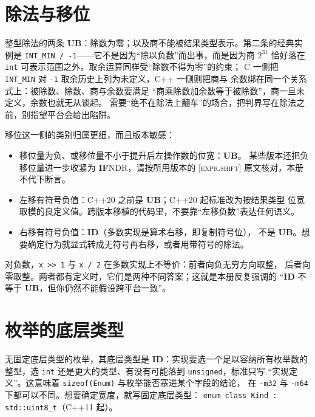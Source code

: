 \documentclass[12pt,a4paper,fontset=fandol]{ctexbook}
\newcommand{\cpp}[1]{C++#1}
\newcommand{\Tp}[1]{\texttt{#1}}
\newcommand{\Bk}{\discretionary{}{}{}}
\newcommand{\Lang}[1]{\textsf{#1}}
\newcommand{\CL}{\Lang{C}}
\newcommand{\CPP}{\Lang{C++}}
\newcommand{\UB}{\textbf{\textsf{UB}}}
\newcommand{\IDB}{\textbf{\textsf{ID}}}
\newcommand{\ILLF}{\textbf{\textsf{IF}}}
\newcommand{\Std}[1]{\textsc{[#1]}}
\begin{document}
\section{除法与移位}\label{sec:ub09-div-shift}

整型除法的两条 \UB{}：除数为零；以及商不能被结果类型表示。第二条的经典实例是
\Tp{INT\_MIN / -1}——它不是因为“除以负数”而出事，而是因为商
$2^{31}$ 恰好落在 \Tp{int} 可表示范围之外。取余运算同样受“除数不得为零”的约束；
\CL{} 一侧把 \Tp{INT\_MIN} 对 \Tp{-1} 取余历史上列为未定义，\CPP{} 一侧则把商与
余数绑在同一个关系式上：被除数、除数、商与余数要满足
“商乘除数加余数等于被除数”，商一旦未定义，余数也就无从谈起。
需要“绝不在除法上翻车”的场合，把判界写在除法之前，别指望平台会给出陷阱。

移位这一侧的类别归属更细，而且版本敏感：

\begin{itemize}
  \item 移位量为负、或移位量不小于提升后左操作数的位宽：\UB{}。
        某些版本还把负移位量进一步收紧为 \ILLF{NDR}，请按所用版本的
        \Std{expr.shift} 原文核对，本册不代下断言。
  \item 左移有符号负值：\cpp{20} 之前是 \UB{}；\cpp{20} 起标准改为按结果类型
        位宽取模的良定义值。跨版本移植的代码里，不要靠“左移负数”表达任何语义。
  \item 右移有符号负值：\IDB{}（多数实现是算术右移，即复制符号位），
        不是 \UB{}。想要确定行为就显式转成无符号再右移，或者用带符号的除法。
\end{itemize}

\begin{warning}[title={别把“除二向下取整”写成“右移一位”}]
对负数，\Tp{x >> 1} 与 \Tp{x / 2} 在多数实现上不等价：前者向负无穷方向取整，
后者向零取整。两者都有定义时，它们是两种不同答案；这就是本册反复强调的
“\IDB{} 不等于 \UB{}，但你仍然不能假设跨平台一致”。
\end{warning}

\section{枚举的底层类型}\label{sec:ub09-enum}

无固定底层类型的枚举，其底层类型是 \IDB{}：实现要选一个足以容纳所有枚举数的
整型，选 \Tp{int} 还是更大的类型、有没有可能落到 \Tp{unsigned}，标准只写
“实现定义”。这意味着 \Tp{sizeof(Enum)} 与枚举能否塞进某个字段的结论，
在 \Tp{-m32} 与 \Tp{-m64} 下都可以不同。想要确定宽度，就写固定底层类型：
\Tp{enum class Kind : std::uint8{\Bk}\_t}（\cpp{11} 起）。
\end{document}

